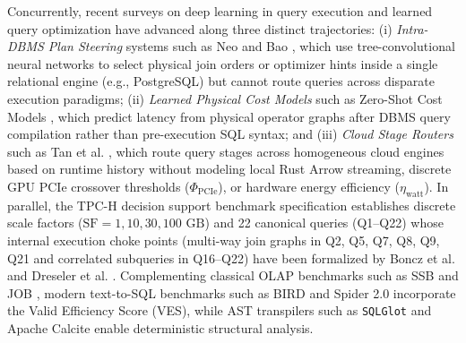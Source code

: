 \documentclass[10pt,a4paper]{article}
\begin{document}
Concurrently, recent surveys on deep learning in query execution \cite{milicevic2024dlquery} and learned query optimization have advanced along three distinct trajectories: (i) \emph{Intra-DBMS Plan Steering} systems such as Neo \cite{marcus2019neo} and Bao \cite{marcus2021bao}, which use tree-convolutional neural networks to select physical join orders or optimizer hints inside a single relational engine (e.g., PostgreSQL) but cannot route queries across disparate execution paradigms; (ii) \emph{Learned Physical Cost Models} such as Zero-Shot Cost Models \cite{hilprecht2022zeroshot}, which predict latency from physical operator graphs after DBMS query compilation rather than pre-execution SQL syntax; and (iii) \emph{Cloud Stage Routers} such as Tan et al. \cite{tan2023stage}, which route query stages across homogeneous cloud engines based on runtime history without modeling local Rust Arrow streaming, discrete GPU PCIe crossover thresholds ($\Phi_{\text{PCIe}}$), or hardware energy efficiency ($\eta_{\text{watt}}$). In parallel, the TPC-H decision support benchmark specification \cite{tpc2022tpch} establishes discrete scale factors ($\text{SF}=1, 10, 30, 100\text{ GB}$) and 22 canonical queries (Q1--Q22) whose internal execution choke points (multi-way join graphs in Q2, Q5, Q7, Q8, Q9, Q21 and correlated subqueries in Q16--Q22) have been formalized by Boncz et al. \cite{boncz2014tpch} and Dreseler et al. \cite{dreseler2020quantifying}. Complementing classical OLAP benchmarks such as SSB \cite{oneil2009ssb} and JOB \cite{leis2015job}, modern text-to-SQL benchmarks such as BIRD \cite{li2023bird} and Spider 2.0 \cite{lei2025spider2} incorporate the Valid Efficiency Score (VES), while AST transpilers such as \texttt{SQLGlot} \cite{mao2024sqlglot} and Apache Calcite \cite{begoli2018calcite} enable deterministic structural analysis.
\end{document}
